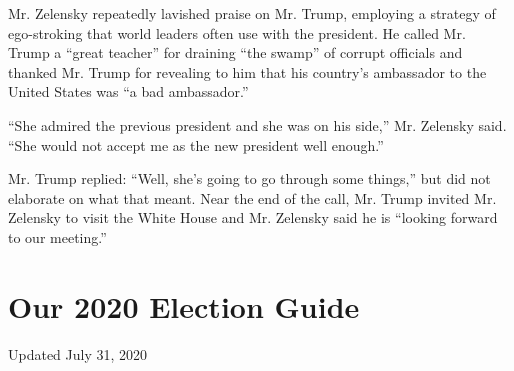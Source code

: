 Mr. Zelensky repeatedly lavished praise on Mr. Trump, employing a
strategy of ego-stroking that world leaders often use with the
president. He called Mr. Trump a ``great teacher'' for draining ``the
swamp'' of corrupt officials and thanked Mr. Trump for revealing to him
that his country's ambassador to the United States was ``a bad
ambassador.''

``She admired the previous president and she was on his side,'' Mr.
Zelensky said. ``She would not accept me as the new president well
enough.''

Mr. Trump replied: ``Well, she's going to go through some things,'' but
did not elaborate on what that meant. Near the end of the call, Mr.
Trump invited Mr. Zelensky to visit the White House and Mr. Zelensky
said he is ``looking forward to our meeting.''

\hypertarget{our-2020-election-guide}{%
\section{Our 2020 Election Guide}\label{our-2020-election-guide}}

Updated July 31, 2020

